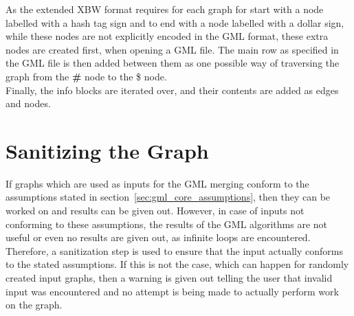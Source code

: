\documentclass[a4paper,12pt,twoside,BCOR=10mm]{scrbook}
\begin{document}
As the extended XBW format requires for each graph for start with a node labelled with a 
hash tag sign and to end with a node labelled with a dollar sign, 
while these nodes are not explicitly encoded in the GML format, 
these extra nodes are created first, when opening a GML file. 
The main row as specified in the GML file is then added between them as one possible way 
of traversing the graph from the \textbf{\#} node to the \$ node. \\
Finally, the info blocks are iterated over, and their contents are added as edges and nodes.

\section{Sanitizing the Graph}

If graphs which are used as inputs for the GML merging conform to the assumptions 
stated in section~\ref{sec:gml_core_assumptions}, 
then they can be worked on and results can be given out. 
However, in case of inputs not conforming to these assumptions, the results of the GML algorithms 
are not useful or even no results are given out, as infinite loops are encountered. 
Therefore, a sanitization step is used to ensure that the input actually conforms to the 
stated assumptions. If this is not the case, which can happen for randomly created input graphs, 
then a warning is given out telling the user that invalid input was encountered and 
no attempt is being made to actually perform work on the graph.
\end{document}
